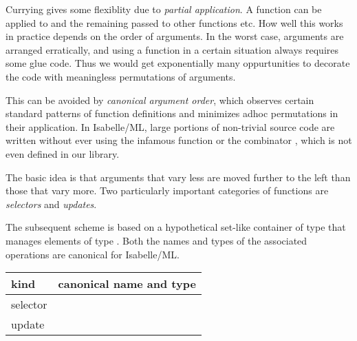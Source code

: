 \begin{isabellebody}
\begin{isamarkuptext}
  Currying gives some flexiblity due to \emph{partial application}.  A
  function  can be applied to 
  and the remaining  passed to other functions
  etc.  How well this works in practice depends on the order of
  arguments.  In the worst case, arguments are arranged erratically,
  and using a function in a certain situation always requires some
  glue code.  Thus we would get exponentially many oppurtunities to
  decorate the code with meaningless permutations of arguments.

  This can be avoided by \emph{canonical argument order}, which
  observes certain standard patterns of function definitions and
  minimizes adhoc permutations in their application.  In Isabelle/ML,
  large portions of non-trivial source code are written without ever
  using the infamous function  or the
  combinator , which is not even
  defined in our library.

  \medskip The basic idea is that arguments that vary less are moved
  further to the left than those that vary more.  Two particularly
  important categories of functions are \emph{selectors} and
  \emph{updates}.

  The subsequent scheme is based on a hypothetical set-like container
  of type \isa{{\isasymbeta}} that manages elements of type \isa{{\isasymalpha}}.  Both
  the names and types of the associated operations are canonical for
  Isabelle/ML.

  \medskip
  \begin{tabular}{ll}
  kind & canonical name and type \\\hline
  selector & \isa{member{\isacharcolon}\ {\isasymbeta}\ {\isasymrightarrow}\ {\isasymalpha}\ {\isasymrightarrow}\ bool} \\
  update & \isa{insert{\isacharcolon}\ {\isasymalpha}\ {\isasymrightarrow}\ {\isasymbeta}\ {\isasymrightarrow}\ {\isasymbeta}} \\
  \end{tabular}
  \medskip


\end{isamarkuptext}
\end{isabellebody}
